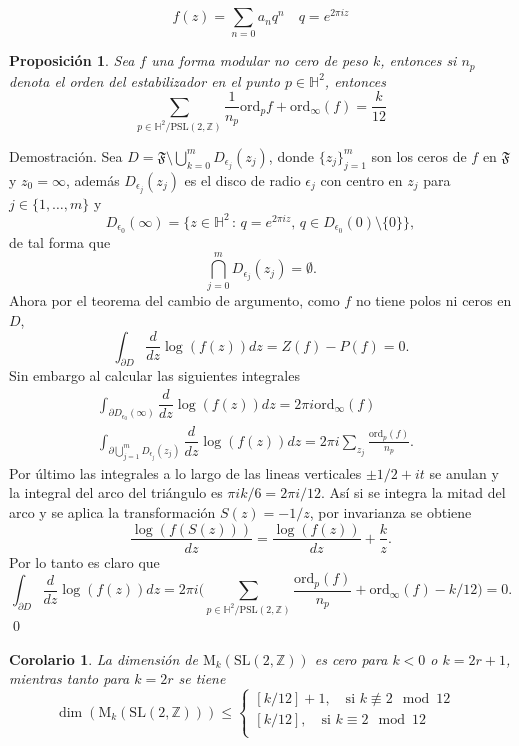 \documentclass[letterpaper]{article}
\newtheorem{prop}[teorema]{Proposici\'on}
\newtheorem{cor}[teorema]{Corolario}
\newcommand{\dem}{{\noindent \sc Demostraci\'on. }}
\newcommand{\pslz}{\ensuremath{\mathrm{PSL}(2,\mathbb Z) }}
\newcommand{\hd}{\ensuremath{\mathbb H^2}}
\newcommand{\slz}{\ensuremath{\mathrm{SL}(2,\mathbb Z) }}
\newcommand{\mdlr}{\ensuremath{\mathrm{M}}}
\begin{document}
\[
    f(z)=\sum_{n=0}a_nq^n\quad q=e^{2\pi iz}
\]
\begin{prop}\label{mod-cero}
Sea $f$ una forma modular no cero de peso $k$, entonces si $n_p$ denota el orden del estabilizador en el punto \(p\in\hd\), entonces
\begin{equation}\label{mod-dim}
\sum_{p\in\hd/\pslz}\frac{1}{n_p}\mathrm{ord}_p{f}+\mathrm{ord}_{\infty}(f)=\frac{k}{12}
\end{equation}
\end{prop}
\dem Sea \(D=\mathfrak{F}\setminus\bigcup_{k=0}^{m}D_{\epsilon_j}(z_j)\), donde \(\{z_j\}_{j=1}^m\) son los ceros de \(f\) en \(\mathfrak{F}\) y \(z_0=\infty\), además \(D_{\epsilon_{j}}(z_j)\) es el disco de radio \(\epsilon_j\) con centro en \(z_j\) para \(j\in\{1,\dots,m\}\) y
\[
    D_{\epsilon_0}(\infty)=\{z\in\hd\,:\,q=e^{2\pi iz},\,q\in D_{\epsilon_0}(0)\setminus\{0\}\},
\]
de tal forma que
\[
    \bigcap_{j=0}^{m} D_{\epsilon_j}(z_j)=\emptyset.
\]
Ahora por el teorema del cambio de argumento, como \(f\) no tiene polos ni ceros en \(D\),
\[
    \int_{\partial D}\dfrac{d}{dz}\log(f(z))dz=Z(f)-P(f)=0.
\]
Sin embargo al calcular las siguientes integrales
\begin{align*}
    \int_{\partial D_{\epsilon_0}(\infty)}\dfrac{d}{dz}\log(f(z))dz=2\pi i \mathrm{ord}_{\infty}(f)\\
    \int_{\partial \bigcup_{j=1}^{m} D_{\epsilon_j}(z_j)}\dfrac{d}{dz}\log(f(z))dz=2\pi i\sum_{z_j}\frac{\mathrm{ord}_{p}(f)}{n_p}.&
\end{align*}
Por último las integrales a lo largo de las lineas verticales \(\pm1/2+it\) se anulan y la integral del arco del triángulo es \(\pi i k/6=2\pi i/12\). Así si se integra la mitad del arco y se aplica la transformación \(S(z)=-1/z\), por invarianza se obtiene
\[
    \dfrac{\log(f(S(z)))}{dz}=\dfrac{\log(f(z))}{dz}+\frac{k}{z}.
\]
Por lo tanto es claro que
\[
    \int_{\partial D}\dfrac{d}{dz}\log(f(z))dz=2\pi i\Big(\sum_{p\in\hd/\pslz}\frac{\mathrm{ord}_p(f)}{n_p}+\mathrm{ord}_{\infty}(f)-k/12\Big)=0.
\]
\qed
\begin{cor}
La dimensión de $\mdlr_{k}(\slz)$ es cero para $k<0$ o $k=2r+1$, mientras tanto para $k=2r$ se tiene
\[
    \dim(\mdlr_k(\slz))\leq
\begin{cases}
    [k/12]+1,\quad\text{si }k\not\equiv 2\mod 12&\\
    [k/12],\quad\text{si }k\equiv 2\mod 12\\
\end{cases}
\]
\end{cor}
\end{document}
